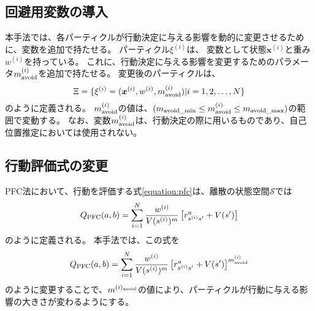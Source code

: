 \subsection{回避用変数の導入}
本手法では、各パーティクルが行動決定に与える影響を動的に変更させるために、変数を追加で持たせる。
パーティクル$\xi^{(i)}$は、 変数として状態$\bm{x}^{(i)}$と重み$w^{(i)}$を持っている。
これに、行動決定に与える影響を変更するためのパラメータ$m^{(i)}_{\rm avoid}$を追加で持たせる。
変更後のパーティクルは、
\begin{equation}
\label{particles}
  \Xi = \{ \xi^{(i)} =
               (\bm{x}^{(i)}, w^{(i)}, m^{(i)}_{\rm avoid}) |i = 1,2,\dots,N \}
\end{equation}
のように定義される。
$m^{(i)}_{\rm avoid}$の値は、$(m_{\rm avoid\_min} \leq m^{(i)}_{\rm avoid} \leq m_{\rm avoid\_max})$の範囲で変動する。
なお、変数$m^{(i)}_{\rm avoid}$は、行動決定の際に用いるものであり、自己位置推定においては使用されない。

\subsection{行動評価式の変更}
PFC法において、行動を評価する式\ref{equation:pfc}は、離散の状態空間$\mathcal{S}$では
\begin{equation}
\label{equation:finite pfc}
  Q_{\rm PFC}(a, b) = \sum_{i=1}^{N} \frac{ w^{(i)} }{ V(s^{(i)})^{m} }
                      \left[r^{a}_{s^{(i)} s^{\prime}} + V(s^{\prime}) \right]
\end{equation}
のように定義される。
本手法では、この式を
\begin{equation}
\label{equation:modified pfc}
  Q_{\rm PFC}(a, b) = \sum_{i=1}^{N} \frac{ w^{(i)} }{ V(s^{(i)})^{m} }
                      \left[r^{a}_{s^{(i)} s^{\prime}}
                            + V(s^{\prime}) \right] ^{m^{(i)}_{\rm avoid}}
\end{equation}
のように変更することで、$m^{(i)_{\rm avoid}}$の値により、パーティクルが行動に与える影響の大きさが変わるようにする。

